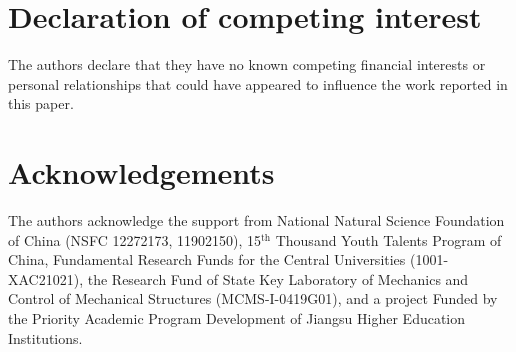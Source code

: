 \documentclass[reprint,3p,sort&compress,times,onecolumn]{elsarticle}
\begin{document}
\section*{Declaration of competing interest}
The authors declare that they have no known competing financial interests or personal relationships that could have appeared to influence the work reported in this paper.

\section*{Acknowledgements}
The authors acknowledge the support from National Natural Science Foundation of China (NSFC 12272173, 11902150), 15$^\text{th}$ Thousand Youth Talents Program of China, Fundamental Research Funds for the Central Universities (1001-XAC21021), the Research Fund of State Key Laboratory of Mechanics and Control of Mechanical Structures (MCMS-I-0419G01), and a project Funded by the Priority Academic Program Development of Jiangsu Higher Education Institutions.




\appendix
\end{document}
